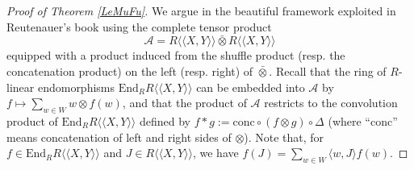 \documentclass[ALCO,Unicode,published]{cedram}
\def\lp{\langle}
\def\rp{\rangle}
\def\la{\langle}
\def\ra{\rangle}
\def\lala{\la\!\la}
\def\rara{\ra\!\ra}
\begin{document}
\begin{proof}[Proof of Theorem \ref{LeMuFu}]
We argue in the beautiful framework exploited in Reutenauer's book \cite[1.5]{Reu}
using the complete tensor product
$$
\mathscr{A}=R\lala X,Y\rara \bar\otimes R\lala X,Y\rara
$$
equipped with a product induced from 
the shuffle product (resp. the concatenation product)
on the left (resp. right) of $\bar\otimes$. 
Recall that the ring of
$R$-linear endomorphisms $\mathrm{End}_RR\lala X,Y\rara$
can be embedded into $\mathscr{A}$ by 
$f\mapsto \sum_{w\in W} w\otimes f(w)$, and that the product of 
$\mathscr{A}$ restricts to the convolution product of $\mathrm{End}_RR\lala X,Y\rara$
defined by $f\ast g:=\mathrm{conc}\circ(f\otimes g)\circ \Delta$
(where ``$\mathrm{conc}$'' means concatenation of left and right sides of $\otimes$).
Note that, for $f\in\mathrm{End}_R R\lala X,Y\rara$ and  $J\in R\lala X,Y\rara$,
we have $f(J)=\sum_{w\in W} \lp w,J\rp f(w)$.


\end{proof}
\end{document}
